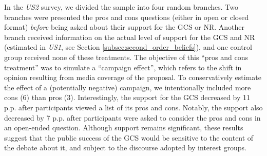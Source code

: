 \documentclass{nature}
\begin{document}
In the \textit{US2} survey, we divided the sample into four random branches. Two branches were presented the pros and cons questions (either in open or closed format) \textit{before} being asked about their support for the GCS or NR. Another branch received information on the actual level of support for the GCS and NR (estimated in \textit{US1}, see Section \ref{subsec:second_order_beliefs}), and one control group received none of these treatments. %
The objective of this ``pros and cons treatment'' was to simulate a ``campaign effect'',\cite{anderson_can_2023} which refers to the shift in opinion resulting from media coverage of the proposal. To conservatively estimate the effect of a (potentially negative) campaign, we intentionally included more cons (6) than pros (3). Interestingly, the support for the GCS decreased by 11 p.p. after participants viewed a list of its pros and cons. %
Notably, the support also decreased by 7 p.p. after participants were asked to consider the pros and cons in an open-ended question. Although support remains significant, %
these results suggest that the public success of the GCS would be sensitive to the content of the debate about it, and subject to the discourse adopted by interest groups.


\end{document}
